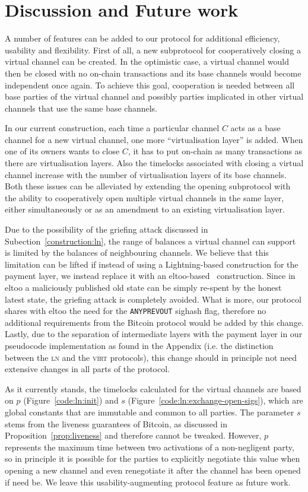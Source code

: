 \section{Discussion and Future work}
  A number of features can be added to our protocol for additional efficiency,
  usability and flexibility. First of all, a new subprotocol for cooperatively
  closing a virtual channel can be created. In the optimistic case, a virtual
  channel would then be closed with no on-chain transactions and its base
  channels would become independent once again. To achieve this goal,
  cooperation is needed between all base parties of the virtual channel and
  possibly parties implicated in other virtual channels that use the same base
  channels.

  In our current construction, each time a particular channel $C$ acts as a base
  channel for a new virtual channel, one more ``virtualisation layer'' is added. When
  one of its owners wants to close $C$, it has to put on-chain as many
  transactions as there are virtualisation layers. Also the timelocks associated
  with closing a virtual channel increase with the number of virtualisation
  layers of its base channels. Both these issues can be alleviated by extending
  the opening subprotocol with the ability to cooperatively open multiple
  virtual channels in the same layer, either simultaneously or as an amendment
  to an existing virtualisation layer.

  Due to the possibility of the griefing attack discussed in
  Subection~\ref{construction:ln}, the range of balances a virtual channel can
  support is limited by the balances of neighbouring channels. We believe that
  this limitation can be lifted if instead of using a Lightning-based
  construction for the payment layer, we instead replace it with an
  eltoo-based~\cite{eltoo} construction. Since in eltoo a maliciously published
  old state can be simply re-spent by the honest latest state, the griefing
  attack is completely avoided. What is more, our protocol shares with eltoo the
  need for the \texttt{ANYPREVOUT} sighash flag, therefore no additional
  requirements from the Bitcoin protocol would be added by this change. Lastly,
  due to the separation of intermediate layers with the payment layer in our
  pseudocode implementation as found in the Appendix (i.e. the distinction
  between the \textsc{ln} and the \textsc{virt} protocols), this change should
  in principle not need extensive changes in all parts of the protocol.

  As it currently stands, the timelocks calculated for the virtual channels are
  based on $p$ (Figure~\ref{code:ln:init}) and $s$
  (Figure~\ref{code:ln:exchange-open-sigs}),
  which are global constants that are immutable and common to all parties. The 
  parameter $s$
  stems from the liveness guarantees of Bitcoin, as discussed in
  Proposition~\ref{prop:liveness} and therefore cannot be tweaked. However, $p$
  represents the maximum time between two activations of a non-negligent party,
  so in principle it is possible for the parties to explicitly negotiate this
  value when opening a new channel and even renegotiate it after the channel has
  been opened if need be. We leave this usability-augmenting protocol feature as
  future work.


